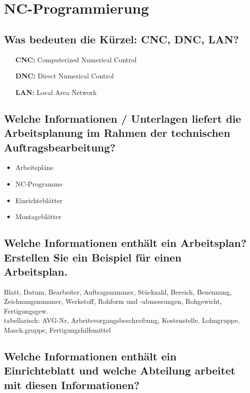 \newpage

\section{NC-Programmierung}


\subsection*{Was bedeuten die Kürzel: CNC, DNC, LAN?}

\begin{itemize}
\item[\textbf{CNC:}] Computerized Numerical Control
\item[\textbf{DNC:}] Direct Numerical Control
\item[\textbf{LAN:}] Local Area Network
\end{itemize}


\subsection*{Welche Informationen / Unterlagen liefert die Arbeitsplanung im Rahmen der technischen Auftragsbearbeitung?}

\begin{itemize}
\item Arbeitspläne
\item NC-Programme
\item Einrichteblätter
\item Montageblätter
\end{itemize}


\subsection*{Welche Informationen enthält ein Arbeitsplan? Erstellen Sie ein Beispiel für einen Arbeitsplan.}

Blatt, Datum, Bearbeiter, Auftragsnummer, Stückzahl, Bereich, Benennung, Zeichnungsnummer, Werkstoff, Rohform und -abmessungen, Rohgewicht, Fertigungsgew. \\
tabellarisch: AVG-Nr, Arbeitsvorgangsbeschreibung, Kostenstelle, Lohngruppe, Masch.gruppe, 
Fertigungshilfsmittel

\begin{figure}[h]
\centering
\end{figure}


\subsection*{Welche Informationen enthält ein Einrichteblatt und welche Abteilung arbeitet mit diesen Informationen?}

